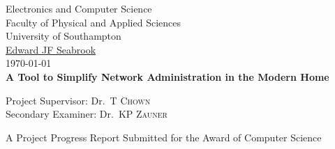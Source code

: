 
\begin{titlepage}

\begin{center}



\LARGE Electronics and Computer Science\\
Faculty of Physical and Applied Sciences\\
University of Southampton
\\[1.5cm]

\href{mailto:ejfs1g10@ecs.soton.ac.uk}{Edward JF Seabrook}\\[0.5cm]

\today \\[1cm]
{\bfseries A Tool to Simplify Network Administration in the Modern Home}\\[1.5cm]

\vfill

\large
Project Supervisor: 
Dr.~T \textsc{Chown}\\

\large
Secondary Examiner:
Dr.~KP \textsc{Zauner} 

\vfill

A Project Progress Report Submitted for the Award of Computer Science

\end{center}

\end{titlepage}
